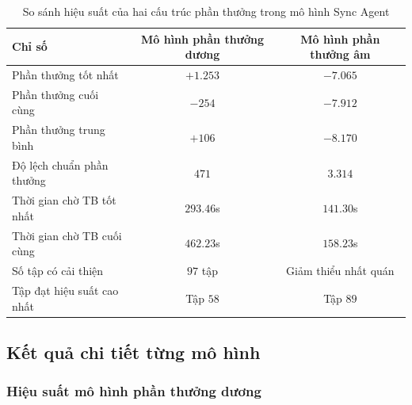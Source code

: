 \begin{table}[!htp]
    \centering
    \caption{So sánh hiệu suất của hai cấu trúc phần thưởng trong mô hình Sync Agent}
    \label{tab:sync_performance_comparison}
    \begin{tabular}{@{}lcc@{}}
        \toprule
        \textbf{Chỉ số} & \textbf{Mô hình phần thưởng dương} & \textbf{Mô hình phần thưởng âm} \\
        \midrule
        Phần thưởng tốt nhất      & $+1.253$                      & $-7.065$                      \\
        Phần thưởng cuối cùng     & $-254$                        & $-7.912$                      \\
        Phần thưởng trung bình    & $+106$                        & $-8.170$                      \\
        Độ lệch chuẩn phần thưởng & $471$                         & $3.314$                       \\
        Thời gian chờ TB tốt nhất & $293.46$s                        & $141.30$s                        \\
        Thời gian chờ TB cuối cùng & $462.23$s                        & $158.23$s                        \\
        Số tập có cải thiện       & $97$ tập                         & Giảm thiểu nhất quán            \\
        Tập đạt hiệu suất cao nhất & Tập $58$                         & Tập $89$                         \\
        \bottomrule
    \end{tabular}
\end{table}

\subsection{Kết quả chi tiết từng mô hình}

\subsubsection{Hiệu suất mô hình phần thưởng dương}

